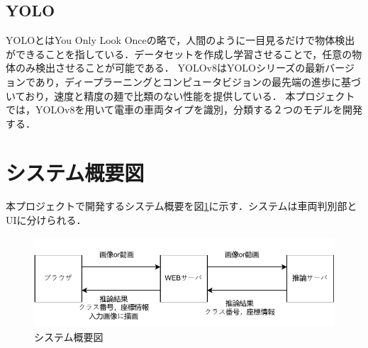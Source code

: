




\subsection{YOLO}
YOLOとはYou Only Look Onceの略で，人間のように一目見るだけで物体検出ができることを指している．データセットを作成し学習させることで，任意の物体のみ検出させることが可能である．
YOLOv8はYOLOシリーズの最新バージョンであり，ディープラーニングとコンピュータビジョンの最先端の進歩に基づいており，速度と精度の麺で比類のない性能を提供している．
本プロジェクトでは，YOLOv8を用いて電車の車両タイプを識別，分類する２つのモデルを開発する．

\section{システム概要図}
本プロジェクトで開発するシステム概要を図\ref{FIG}に示す．システムは車両判別部とUIに分けられる．\\

\begin{figure}
	\centering
	\includegraphics [width=\linewidth]{fig/system.pdf}
	\caption{システム概要図}
	\label{FIG}
\end{figure}






